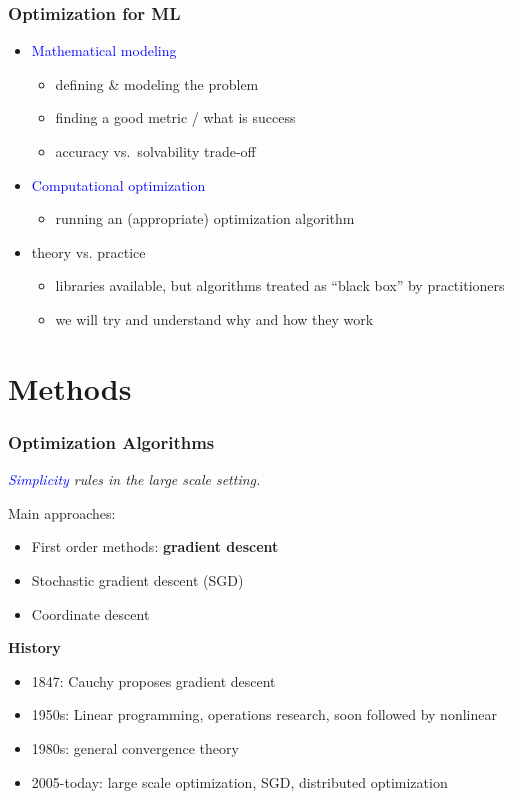 \documentclass{beamer}
\begin{document}
\begin{frame}
  \frametitle{Optimization for ML}
  \begin{itemize}
    \item \textcolor{blue}{Mathematical modeling}
          \begin{itemize}
            \item defining \& modeling the problem
            \item finding a good metric / what is success
            \item accuracy vs.\ solvability trade-off
          \end{itemize}
    \item \textcolor{blue}{Computational optimization}
         \begin{itemize}
           \item running an (appropriate) optimization algorithm
         \end{itemize}
    \item theory vs. practice
          \begin{itemize}
            \item libraries available, but algorithms treated as ``black box'' by practitioners
            \item we will try and understand why and how they work
          \end{itemize}
  \end{itemize}
\end{frame}


\section{Methods}%

\begin{frame}
  \frametitle{Optimization Algorithms}
  \begin{center}
    \textit{\textcolor{blue}{Simplicity} rules in the large scale setting.}
  \end{center}
  Main approaches:
  \begin{itemize}
    \item First order methods: \textbf{gradient descent}
    \item Stochastic gradient descent (SGD)
    \item Coordinate descent
  \end{itemize}

  \textbf{History}
  \begin{itemize}
    \item 1847: Cauchy proposes gradient descent
    \item 1950s: Linear programming, operations research, soon followed by nonlinear
    \item 1980s: general convergence theory
    \item 2005-today: large scale optimization, SGD, distributed optimization
  \end{itemize}
\end{frame}
\end{document}
